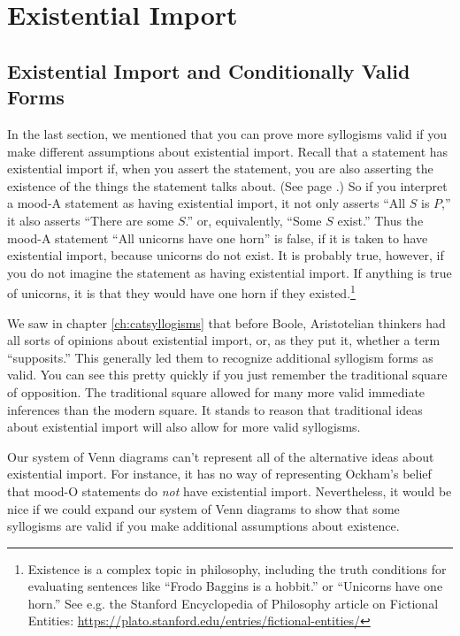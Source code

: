 \chapter{Existential Import}\label{ch:existentialimport}

\section{Existential Import and Conditionally Valid Forms}

\label{sec:conditionally_valid_forms}
In the last section, we mentioned that you can prove more syllogisms valid if you make different assumptions about existential import. Recall that a statement has existential import if, when you assert the statement, you are also asserting the existence of the things the statement talks about. (See page \pageref{def:Existential_import}.) So if you interpret a mood-A statement as having existential import, it not only asserts ``All $S$ is $P$,'' it also asserts ``There are some $S$.'' or, equivalently, ``Some $S$ exist.'' Thus the mood-A statement ``All unicorns have one horn'' is false, if it is taken to have existential import, because unicorns do not exist. It is probably true, however, if you do not imagine the statement as having existential import. If anything is true of unicorns, it is that they would have one horn if they existed.\footnote{Existence is a complex topic in philosophy, including the truth conditions for evaluating sentences like ``Frodo Baggins is a hobbit.'' or ``Unicorns have one horn.'' See e.g. the Stanford Encyclopedia of Philosophy article on Fictional Entities: \href{https://plato.stanford.edu/entries/fictional-entities/}{https://plato.stanford.edu/entries/fictional-entities/}}

We saw in chapter \ref{ch:catsyllogisms} that before Boole, Aristotelian thinkers had all sorts of opinions about existential import, or, as they put it, whether a term ``supposits.'' This generally led them to recognize additional syllogism forms as valid. You can see this pretty quickly if you just remember the traditional square of opposition. The traditional square allowed for many more valid immediate inferences than the modern square. It stands to reason that traditional ideas about existential import will also allow for more valid syllogisms.

Our system of Venn diagrams can't represent all of the alternative ideas about existential import. For instance, it has no way of representing Ockham's belief that mood-O statements do \emph{not} have existential import. Nevertheless, it would be nice if we could expand our system of Venn diagrams to show that some syllogisms are valid if you make additional assumptions about existence.

